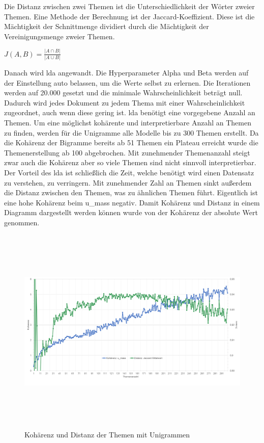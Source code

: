 Die Distanz zwischen zwei Themen ist die Unterschiedlichkeit der Wörter zweier Themen. Eine Methode der Berechnung ist der Jaccard-Koeffizient. Diese ist die Mächtigkeit der Schnittmenge dividiert durch die Mächtigkeit der Vereinigungsmenge zweier Themen.


\begin{center}
	$J(A,B) = \frac{\left|A \cap B\right|}{\left|A \cup B\right|}$ 
\end{center}


Danach wird \ac{lda} angewandt. Die Hyperparameter Alpha und Beta werden auf der Einstellung auto belassen, um die Werte selbst zu erlernen. Die Iterationen werden auf 20.000 gesetzt und die minimale Wahrscheinlichkeit beträgt null. Dadurch wird jedes Dokument zu jedem Thema mit einer Wahrscheinlichkeit zugeordnet, auch wenn diese gering ist. \ac{lda} benötigt eine vorgegebene Anzahl an Themen. Um eine möglichst kohärente und interpretierbare Anzahl an Themen zu finden, werden für die Unigramme alle Modelle bis zu 300 Themen erstellt. Da die Kohärenz der Bigramme bereits ab 51 Themen ein Plateau erreicht wurde die Themenerstellung ab 100 abgebrochen. Mit zunehmender Themenanzahl steigt zwar auch die Kohärenz aber so viele Themen sind nicht sinnvoll interpretierbar. Der Vorteil des \ac{lda} ist schließlich die Zeit, welche benötigt wird einen Datensatz zu verstehen, zu verringern. Mit zunehmender Zahl an Themen sinkt außerdem die Distanz zwischen den Themen, was zu ähnlichen Themen führt. Eigentlich ist eine hohe Kohärenz beim u\_mass negativ. Damit Kohärenz und Distanz in einem Diagramm dargestellt werden können wurde von der Kohärenz der absolute Wert genommen.

\begin{figure}[htpb]
	\centering
	\includegraphics[width=\textwidth,height=10cm,keepaspectratio=true]{img/coherenceAndDistanceUnigram.png}
	\caption{
		Kohärenz und Distanz der Themen mit Unigrammen
	}
	\label{fig:Kohärenz_Distanz_Unigramme}
\end{figure}

